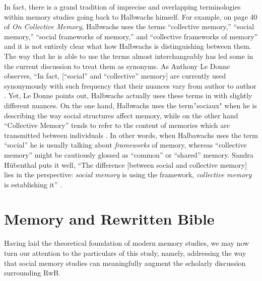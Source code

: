 In fact, there is a grand tradition of imprecise and overlapping
terminologies within memory studies going back to Halbwachs himself. For
example, on page 40 of \emph{On Collective Memory}, Halbwachs uses the
terms ``collective memory,'' ``social memory,'' ``social frameworks of
memory,'' and ``collective frameworks of memory'' and it is not entirely
clear what how Halbwachs is distinguishing between them. The way that he
is able to use the terms almost interchangeably has led some in the
current discussion to treat them as synonyms. As Anthony Le Donne
observes, ``In fact, {[}``social'' and ``collective'' memory{]} are
currently used synonymously with such frequency that their nuances vary
from author to author \autocite[42 n.8]{ledonne2009}. Yet, Le Donne
points out, Halbwachs actually uses these terms in with slightly
different nuances. On the one hand, Halbwachs uses the term''sociaux"
when he is describing the way social structures affect memory, while on
the other hand ``Collective Memory'' tends to refer to the content of
memories which are transmitted between individuals \autocite[42
n.8]{ledonne2009}. In other words, when Halbawachs uses the term
``social'' he is usually talking about \emph{frameworks} of memory,
whereas ``collective memory'' might be cautiously glossed as ``common''
or ``shared'' memory. Sandra Hübenthal puts it well, ``The difference
{[}between social and collective memory{]} lies in the perspective:
\emph{social memory} is using the framework, \emph{collective memory} is
establishing it'' \autocite[180]{hubenthal_carstens-hasselbalch2012}.

\hypertarget{memory-and-rwb}{%
\section{Memory and Rewritten Bible}\label{memory-and-rwb}}

Having laid the theoretical foundation of modern memory studies, we may
now turn our attention to the particulars of this study, namely,
addressing the way that social memory studies can meaningfully augment
the scholarly discussion surrounding RwB.


